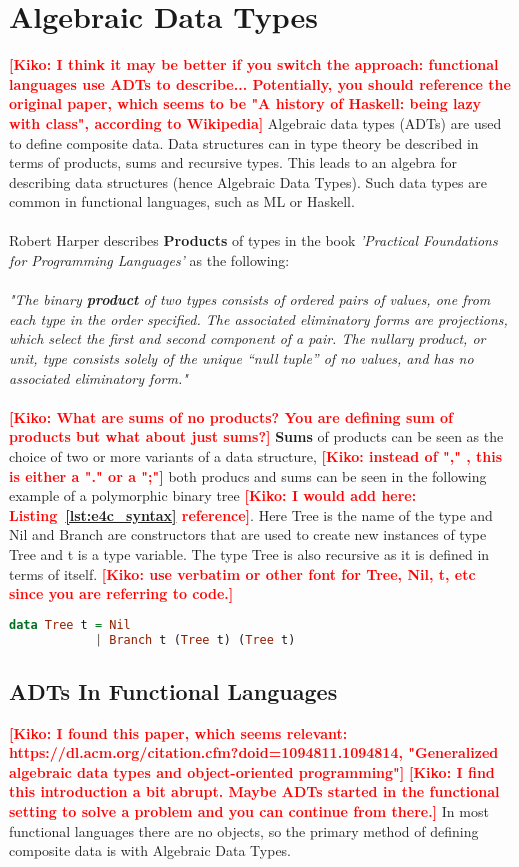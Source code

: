 \documentclass[10pt]{report}
\newcommand{\KIKO}[1]{\textcolor{red}{\textbf{[Kiko: #1]}}}
\begin{document}
\section{Algebraic Data Types}
\KIKO{I think it may be better if you switch the approach: functional languages use ADTs to describe...
Potentially, you should reference the original paper, which seems to be "A history of Haskell: being lazy with class", according to Wikipedia}
Algebraic data types (ADTs) are used to define composite data.  Data structures can in type theory be described in terms of products, sums and recursive types. This leads to an algebra for describing data structures (hence Algebraic Data Types). Such data types are common in functional languages, such as ML or Haskell.
\\
\\
Robert Harper describes \textbf{Products} of types in the book \textit{'Practical Foundations for Programming Languages'} as the following:
\\
\\
\textit{"The binary \textbf{product} of two types consists of ordered pairs of values, one from each type in the order specified. The associated eliminatory forms are projections, which select the first and second component of a pair. The nullary product, or unit, type consists solely of the unique “null tuple” of no values, and has no associated eliminatory form."}
\\
\\
\KIKO{What are sums of no products? You are defining sum of products but what about just sums?}
\textbf{Sums} of products can be seen as the choice of two or more variants of a data structure, \KIKO{instead of "," , this is either a "." or a ";"} both producs and sums can be seen in the following example of a polymorphic binary tree \KIKO{I would add here: Listing~\ref{lst:e4c_syntax} reference}.  Here Tree is the name of the type and Nil and Branch are constructors that are used to create new instances of type Tree and t is a type variable.  The type Tree is also recursive as it is defined in terms of itself.
\KIKO{use verbatim or other font for Tree, Nil, t, etc since you are referring to code.}


\begin{lstlisting}[language=Haskell,caption={Binary tree definition in Haskell},label={lst:e4c_syntax}]
data Tree t = Nil
            | Branch t (Tree t) (Tree t)
\end{lstlisting}
\subsection{ADTs In Functional Languages}%
\KIKO{I found this paper, which seems relevant: https://dl.acm.org/citation.cfm?doid=1094811.1094814, "Generalized algebraic data types and object-oriented programming"}
\KIKO{I find this introduction a bit abrupt. Maybe ADTs started in the functional setting to solve a problem and you can continue from there.}
In most functional languages there are no objects, so the primary method of defining composite data is with Algebraic Data Types.
\end{document}
